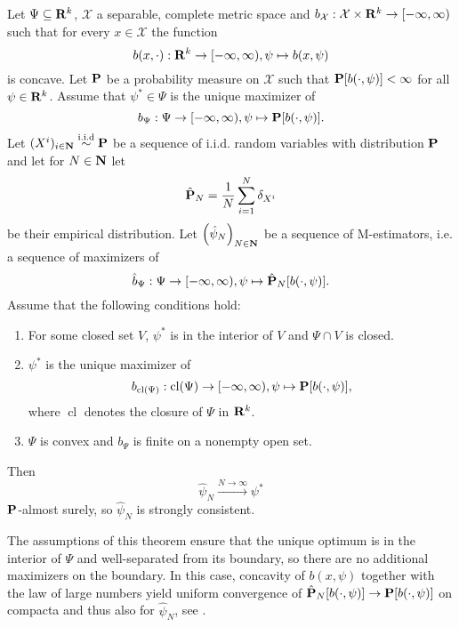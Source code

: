 \begin{theorem}
    \label{thm:haberman-consistent}
    Let $\Psi \subseteq \R^{k}$, $\mathcal X$ a separable, complete metric space and $b_{\mathcal X}: \mathcal X \times \R^{k} \to [- \infty, \infty )$ such that for every $x \in \mathcal X$ the function $$b(x, \cdot): \R^{k} \to [-\infty, \infty), \psi \mapsto b(x, \psi)$$ is concave. Let $\P$ be a probability measure on $\mathcal X$ such that $\P [b(\cdot, \psi)] < \infty$  for all $\psi \in \R^{k}$. Assume that $\psi^{\ast} \in \Psi$ is the unique maximizer of 
    $$
    b_{\Psi}: \Psi \to [-\infty, \infty), \psi \mapsto \P [b(\cdot,\psi)].
    $$ 
    Let $(X^{i})_{i \in \N} \iid \P$ be a sequence of i.i.d. random variables with distribution $\P$ and let for $N \in \N$ let $$\hat \P_{N} = \frac{1}{N} \sum_{i = 1}^N \delta_{X^{i}}$$ be their empirical distribution. Let $\left(\hat\psi_{N}\right)_{N \in \N}$ be a sequence of M-estimators, i.e. a sequence of maximizers of
    $$
    \hat b_{\Psi}: \Psi \to [-\infty, \infty), \psi \mapsto \hat \P_{N} [b(\cdot, \psi)].
    $$
    Assume that the following conditions hold:
    \begin{enumerate}[label=(C\arabic*),ref=(C\arabic*)]
        \item\label{it:C1} For some closed set $V$, $\psi^{\ast}$ is in the interior of $V$ and $\Psi \cap V$ is closed. 
        \item\label{it:C2} $\psi^{\ast}$ is the unique maximizer of $$b_{\operatorname{cl} (\Psi)}: \operatorname{cl} (\Psi) \to [-\infty, \infty), \psi \mapsto \P [b(\cdot, \psi)],$$ where $ \operatorname{cl}$ denotes the closure of $\Psi$ in $\R^{k}$.
        \item\label{it:C3} $\Psi$ is convex and $b_{\Psi}$ is finite on a nonempty open set.
    \end{enumerate}

    Then $$\hat \psi_{N} \stackrel{N \to \infty}\longrightarrow \psi^{\ast}$$ $\P$-almost surely, so $\hat\psi_{N}$ is strongly consistent.
\end{theorem}

The assumptions of this theorem ensure that the unique optimum is in the interior of $\Psi$ and \glqq{}well-separated\grqq{} from its boundary, so there are no additional maximizers on the boundary. In this case, concavity of $b(x, \psi)$ together with the law of large numbers yield uniform convergence of $\hat \P_{N} [b(\cdot, \psi)] \to \P [b(\cdot, \psi)]$ on compacta and thus also for $\hat\psi_{N}$, see \citep[pp. 1652]{Haberman1989Concavity}.

